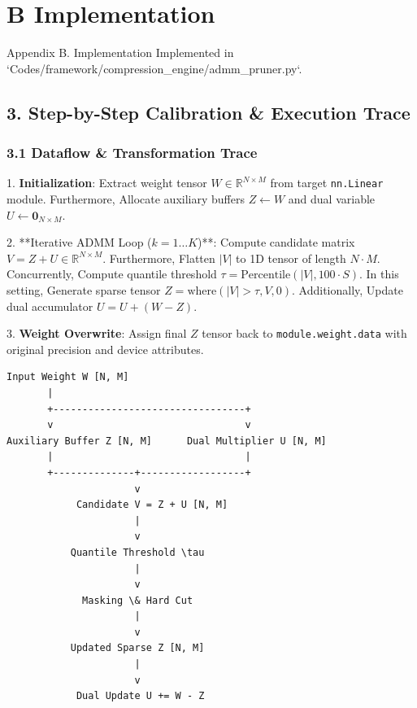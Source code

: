 \section{B Implementation}

 Appendix B. Implementation
Implemented in `Codes/framework/compression\_engine/admm\_pruner.py`.



\subsection{3. Step-by-Step Calibration \& Execution Trace}
\subsubsection{3.1 Dataflow \& Transformation Trace}

1. \textbf{Initialization}:
Extract weight tensor $W \in \mathbb{R}^{N \times M}$ from target \texttt{nn.Linear} module. Furthermore, Allocate auxiliary buffers $Z \leftarrow W$ and dual variable $U \leftarrow \mathbf{0}_{N \times M}$.

2. **Iterative ADMM Loop ($k = 1 \dots K$)**:
Compute candidate matrix $V = Z + U \in \mathbb{R}^{N \times M}$. Furthermore, Flatten $|V|$ to 1D tensor of length $N \cdot M$. Concurrently, Compute quantile threshold $\tau = \text{Percentile}(|V|, 100 \cdot S)$. In this setting, Generate sparse tensor $Z = \text{where}(|V| > \tau, V, 0)$. Additionally, Update dual accumulator $U = U + (W - Z)$.

3. \textbf{Weight Overwrite}:
Assign final $Z$ tensor back to \texttt{module.weight.data} with original precision and device attributes.



\begin{lstlisting}
Input Weight W [N, M]
       |
       +---------------------------------+
       v                                 v
Auxiliary Buffer Z [N, M]      Dual Multiplier U [N, M]
       |                                 |
       +--------------+------------------+
                      v
            Candidate V = Z + U [N, M]
                      |
                      v
           Quantile Threshold \tau 
                      |
                      v
             Masking \& Hard Cut
                      |
                      v
           Updated Sparse Z [N, M]
                      |
                      v
            Dual Update U += W - Z
\end{lstlisting}


